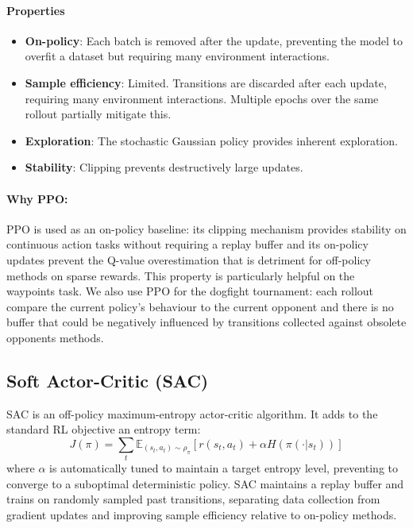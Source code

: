 \documentclass[11pt,a4paper]{article}
\begin{document}
\paragraph{Properties}
\begin{itemize}
  \item \textbf{On-policy}: Each batch is removed after the update, preventing the model to overfit a dataset but requiring many environment interactions.
  \item \textbf{Sample efficiency}: Limited. Transitions are discarded after each update, requiring many environment interactions. Multiple epochs over the same rollout partially mitigate this.
  \item \textbf{Exploration}: The stochastic
    Gaussian policy provides inherent exploration.
  \item \textbf{Stability}: Clipping prevents destructively large updates.
\end{itemize}

\paragraph{Why PPO:}

PPO is used as an on-policy baseline: its clipping mechanism provides stability on continuous action tasks without requiring a replay buffer and its on-policy updates prevent the Q-value overestimation that is detriment for off-policy methods on sparse rewards. This property is particularly helpful on the waypoints task. We also use PPO for the dogfight tournament: each rollout compare the current policy's behaviour to the current opponent and there is no buffer that could be negatively influenced by transitions collected against obsolete opponents methods.

\subsection{Soft Actor-Critic (SAC)}

SAC is an off-policy maximum-entropy actor-critic algorithm. It adds to the standard RL objective an entropy term:
\[
  J(\pi) = \sum_t \mathbb{E}_{(s_t,a_t)\sim\rho_\pi}\!\left[r(s_t,a_t) + \alpha H(\pi(\cdot|s_t))\right]
\]
where $\alpha$ is automatically tuned to maintain a target entropy level, preventing to converge to a suboptimal deterministic policy. SAC maintains a replay buffer and trains on randomly sampled past transitions, separating data collection from gradient updates and improving sample efficiency relative to on-policy methods.
\end{document}
